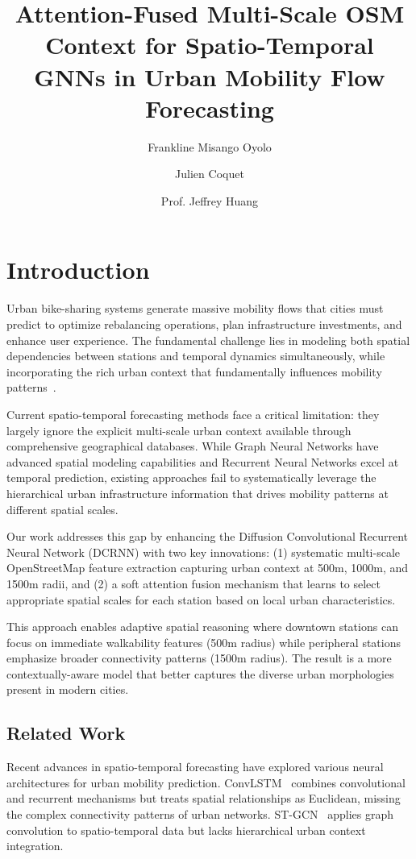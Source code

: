 \documentclass[sigconf,review,nonacm]{acmart}
\title{Attention-Fused Multi-Scale OSM Context for Spatio-Temporal GNNs in Urban Mobility Flow Forecasting}
\author{Frankline Misango Oyolo}
\affiliation{%
  \institution{The University of Hong Kong}
  \city{Hong Kong SAR}
  \country{China}
}
\author{Julien Coquet}
\affiliation{%
  \institution{ETH Z\"urich}
  \city{Z\"urich}
  \country{Switzerland}
}
\author{Prof. Jeffrey Huang}
\affiliation{%
  \institution{\'Ecole Polytechnique F\'ed\'erale de Lausanne (EPFL)}
  \city{Lausanne}
  \country{Switzerland}
}
\begin{document}
\maketitle

\section{Introduction}

Urban bike-sharing systems generate massive mobility flows that cities must predict to optimize rebalancing operations, plan infrastructure investments, and enhance user experience. The fundamental challenge lies in modeling both spatial dependencies between stations and temporal dynamics simultaneously, while incorporating the rich urban context that fundamentally influences mobility patterns~\cite{li2018}.

Current spatio-temporal forecasting methods face a critical limitation: they largely ignore the explicit multi-scale urban context available through comprehensive geographical databases. While Graph Neural Networks have advanced spatial modeling capabilities and Recurrent Neural Networks excel at temporal prediction, existing approaches fail to systematically leverage the hierarchical urban infrastructure information that drives mobility patterns at different spatial scales.

Our work addresses this gap by enhancing the Diffusion Convolutional Recurrent Neural Network (DCRNN) with two key innovations: (1) systematic multi-scale OpenStreetMap feature extraction capturing urban context at 500m, 1000m, and 1500m radii, and (2) a soft attention fusion mechanism that learns to select appropriate spatial scales for each station based on local urban characteristics.

This approach enables adaptive spatial reasoning where downtown stations can focus on immediate walkability features (500m radius) while peripheral stations emphasize broader connectivity patterns (1500m radius). The result is a more contextually-aware model that better captures the diverse urban morphologies present in modern cities.

\subsection{Related Work}

Recent advances in spatio-temporal forecasting have explored various neural architectures for urban mobility prediction. ConvLSTM~\cite{xingjian2015} combines convolutional and recurrent mechanisms but treats spatial relationships as Euclidean, missing the complex connectivity patterns of urban networks. ST-GCN~\cite{yu2018} applies graph convolution to spatio-temporal data but lacks hierarchical urban context integration.
\end{document}
